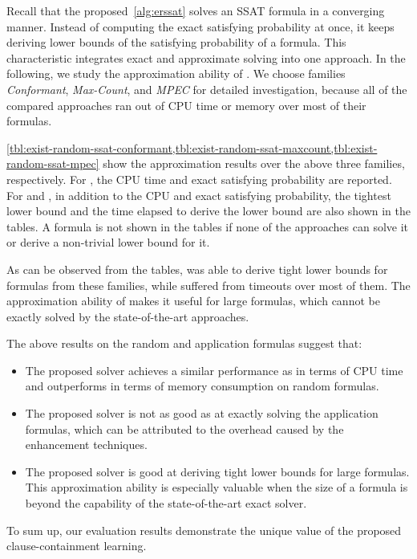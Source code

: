 Recall that the proposed~\cref{alg:erssat} solves an SSAT formula in a converging manner.
Instead of computing the exact satisfying probability at once,
it keeps deriving lower bounds of the satisfying probability of a formula.
This characteristic integrates exact and approximate solving into one approach.
In the following, we study the approximation ability of \erssat.
We choose families \textit{Conformant}, \textit{Max-Count}, and \textit{MPEC} for detailed investigation,
because all of the compared approaches ran out of CPU time or memory over most of their formulas.

\cref{tbl:exist-random-ssat-conformant,tbl:exist-random-ssat-maxcount,tbl:exist-random-ssat-mpec}
show the approximation results over the above three families, respectively.
For \dcssat, the CPU time and exact satisfying probability are reported.
For \erssat and \erssatb, in addition to the CPU and exact satisfying probability,
the tightest lower bound and the time elapsed to derive the lower bound are also shown in the tables.
A formula is not shown in the tables
if none of the approaches can solve it or derive a non-trivial lower bound for it.

As can be observed from the tables,
\erssat was able to derive tight lower bounds for formulas from these families,
while \dcssat suffered from timeouts over most of them.
The approximation ability of \erssat makes it useful for large formulas,
which cannot be exactly solved by the state-of-the-art approaches.

The above results on the random and application formulas suggest that:
\begin{itemize}
    \item The proposed solver \erssat achieves a similar performance as \dcssat in terms of CPU time and outperforms \dcssat in terms of memory consumption on random formulas.
    \item The proposed solver \erssat is not as good as \dcssat at exactly solving the application formulas, which can be attributed to the overhead caused by the enhancement techniques.
    \item The proposed solver \erssat is good at deriving tight lower bounds for large formulas. This approximation ability is especially valuable when the size of a formula is beyond the capability of the state-of-the-art exact solver.
\end{itemize}
To sum up, our evaluation results demonstrate the unique value of the proposed clause-containment learning.